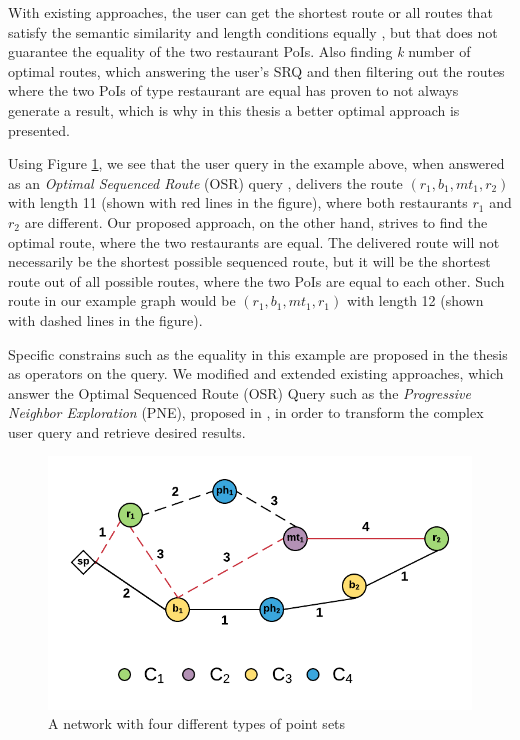 With existing approaches, the user can get the shortest route \cite{OSR} or all routes that satisfy the semantic similarity and length conditions equally \cite{semanticSRQ}, but that does not guarantee the equality of the two restaurant PoIs. Also finding \textit{k} number of optimal routes, which answering the user's SRQ and then filtering out the routes where the two PoIs of type restaurant are equal has proven to not always generate a result, which is why in this thesis a better optimal approach is presented.

\enlargethispage*{30pt}

Using Figure \ref{fig:example}, we see that the user query in the example above, when answered as an \textit{Optimal Sequenced Route} (OSR) query \cite{OSR}, delivers the route $(r_1, b_1, mt_1, r_2)$ with length 11 (shown with red lines in the figure), where both restaurants $r_1$ and $r_2$ are different. Our proposed approach, on the other hand, strives to find the optimal route, where the two restaurants are equal. The delivered route will not necessarily be the shortest possible sequenced route, but it will be the shortest route out of all possible routes, where the two PoIs are equal to each other. Such route in our example graph would be $(r_1, b_1, mt_1, r_1)$ with length 12 (shown with dashed lines in the figure).

Specific constrains such as the equality in this example are proposed in the thesis as operators on the query. We modified and extended existing approaches, which answer the Optimal Sequenced Route (OSR) Query such as the \textit{Progressive Neighbor Exploration} (PNE), proposed in \cite{OSR}, in order to transform the complex user query and retrieve desired results.

\begin{figure}[H]
	\includegraphics[scale=1]{images/Example_routes.png}
	\centering
	\caption{A network with four different types of point sets}
	\label{fig:example}
\end{figure}

